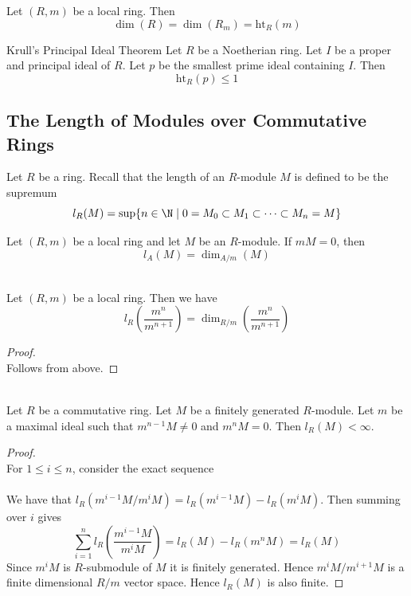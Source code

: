 \documentclass[a4paper]{article}
\begin{document}
\begin{crl}{}{} Let $(R,m)$ be a local ring. Then $$\dim(R)=\dim(R_m)=\text{ht}_R(m)$$
\end{crl}

\begin{thm}{Krull's Principal Ideal Theorem}{} Let $R$ be a Noetherian ring. Let $I$ be a proper and principal ideal of $R$. Let $p$ be the smallest prime ideal containing $I$. Then $$\text{ht}_R(p)\leq 1$$
\end{thm}

\subsection{The Length of Modules over Commutative Rings}
Let $R$ be a ring. Recall that the length of an $R$-module $M$ is defined to be the supremum $$l_R(M)=\text{sup}\{n\in\N\;|\;0=M_0\subset M_1\subset\cdots\subset M_n=M\}$$

\begin{lmm}{}{} Let $(R,m)$ be a local ring and let $M$ be an $R$-module. If $mM=0$, then $$l_A(M)=\dim_{A/m}(M)$$
\end{lmm}

\begin{eg}{}{}\\
Let $(R,m)$ be a local ring. Then we have $$l_R\left(\frac{m^n}{m^{n+1}}\right)=\dim_{R/m}\left(\frac{m^n}{m^{n+1}}\right)$$
\begin{proof}\\
Follows from above. 
\end{proof}
\end{eg}

\begin{lmm}{}{}\\
Let $R$ be a commutative ring. Let $M$ be a finitely generated $R$-module. Let $m$ be a maximal ideal such that $m^{n-1}M\neq 0$ and $m^nM=0$. Then $l_R(M)<\infty$. 
\begin{proof}\\
For $1\leq i\leq n$, consider the exact sequence \\
\\
We have that $l_R(m^{i-1}M/m^iM)=l_R(m^{i-1}M)-l_R(m^iM)$. Then summing over $i$ gives $$\sum_{i=1}^nl_R\left(\frac{m^{i-1}M}{m^iM}\right)=l_R(M)-l_R(m^nM)=l_R(M)$$ Since $m^iM$ is $R$-submodule of $M$ it is finitely generated. Hence $m^iM/m^{i+1}M$ is a finite dimensional $R/m$ vector space. Hence $l_R(M)$ is also finite. 
\end{proof}
\end{lmm}
\end{document}
